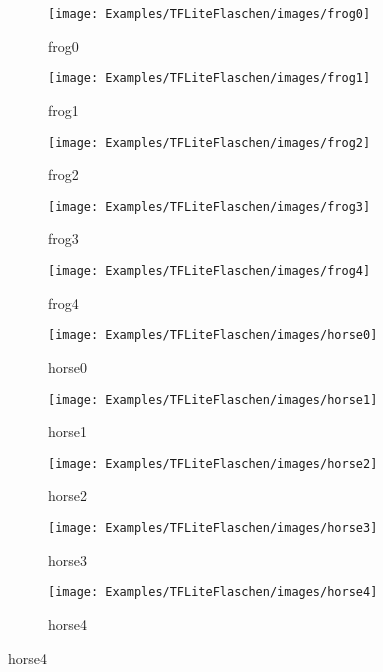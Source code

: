 \begin{figure} [H]
	    \begin{subfigure}{0.19\textwidth}
    \centering
	\texttt{[image: Examples/TFLiteFlaschen/images/frog0]}
	\caption{frog0}
	\end{subfigure}
	\begin{subfigure}{0.19\textwidth}
    \centering
	\texttt{[image: Examples/TFLiteFlaschen/images/frog1]}
	\caption{frog1}
	\end{subfigure}
	\begin{subfigure}{0.19\textwidth}
    \centering
	\texttt{[image: Examples/TFLiteFlaschen/images/frog2]}
	\caption{frog2}
	\end{subfigure}
	\begin{subfigure}{0.19\textwidth}
    \centering
	\texttt{[image: Examples/TFLiteFlaschen/images/frog3]}
	\caption{frog3}
	\end{subfigure}
	\begin{subfigure}{0.19\textwidth}
    \centering
	\texttt{[image: Examples/TFLiteFlaschen/images/frog4]}
	\caption{frog4}
	\end{subfigure}
	
	    \begin{subfigure}{0.19\textwidth}
    \centering
	\texttt{[image: Examples/TFLiteFlaschen/images/horse0]}
	\caption{horse0}
	\end{subfigure}
	\begin{subfigure}{0.19\textwidth}
    \centering
	\texttt{[image: Examples/TFLiteFlaschen/images/horse1]}
	\caption{horse1}
	\end{subfigure}
	\begin{subfigure}{0.19\textwidth}
    \centering
	\texttt{[image: Examples/TFLiteFlaschen/images/horse2]}
	\caption{horse2}
	\end{subfigure}
	\begin{subfigure}{0.19\textwidth}
    \centering
	\texttt{[image: Examples/TFLiteFlaschen/images/horse3]}
	\caption{horse3}
	\end{subfigure}
	\begin{subfigure}{0.19\textwidth}
    \centering
	\texttt{[image: Examples/TFLiteFlaschen/images/horse4]}
	\caption{horse4}
	\end{subfigure}
	

\end{figure}
